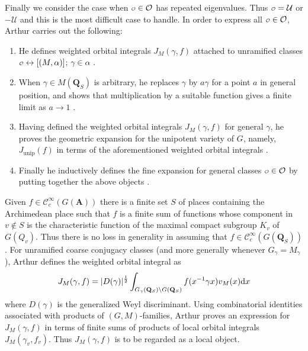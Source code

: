 \documentclass[11pt]{amsart}
\def\A{\mathbf A}
\def\Q{\mathbf Q}
\def\CCC{\mathcal C}
\def\O{\mathcal O}
\def\o{\scalebox{0.8}{$\scriptstyle\mathcal{O}$}}
\def\UUU{\mathcal U}
\def\d{\text d}
\def\bs{\setminus}
\def\mod#1{\lvert #1 \rvert} %
\theoremstyle{remark}
\begin{document}
Finally we consider the case when $\o \in \O$ has repeated eigenvalues. Thus $\o = \UUU$ or $-\UUU$ and this is the most difficult case to handle. In order to express all $\o \in \O$, Arthur carries out the following:
\begin{enumerate}
	\item He defines weighted orbital integrals $J_M(\gamma, f)$ attached to unramified classes $\o \leftrightarrow [(M, \alpha)]$; $\gamma \in \alpha$ \cite{MR625344}. 
	\item When $\gamma \in M(\Q_S)$ is arbitrary, he replaces $\gamma$ by $a \gamma$ for a point $a$ in general position, and shows that multiplication by a suitable function gives a finite limit as $a \to 1$ \cite{MR932848}.
	\item Having defined the weighted orbital integrals $J_M(\gamma, f)$ for general $\gamma$, he proves the geometric expansion for the unipotent variety of $G$, namely, $J_{\text{unip}}(f)$ in terms of the aforementioned weighted orbital integrals \cite{MR828844}. 
	\item Finally he inductively defines the fine expansion for general classes $\o \in \O$ by putting together the above objects \cite{MR835041}.
\end{enumerate}
Given $f \in \CCC_c^\infty(G(\A))$ there is a finite set $S$ of places containing the Archimedean place such that $f$ is a finite sum of functions whose component in $v \not \in S$ is the characteristic function of the maximal compact subgroup $K_v$ of $G(Q_v)$. Thus there is no loss in generality in assuming that $f \in \CCC_c^\infty(G(\Q_S))$. For unramified coarse conjugacy classes (and more generally whenever $G_\gamma = M_\gamma$), Arthur defines the weighted orbital integral as 
\begin{equation} \label{jm}
	J_M(\gamma, f) = \mod{D(\gamma)}^{\frac{1}{2}} \int_{G_\gamma(\Q_S)\bs G(\Q_S)} f(x^{-1}\gamma x) v_M(x) \d x
\end{equation}
where $D(\gamma)$ is the generalized Weyl discriminant. Using combinatorial identities associated with products of $(G, M)$-families, Arthur proves an expression for $J_M(\gamma, f)$ in terms of finite sums of products of local orbital integrals $J_M(\gamma_v, f_v)$. Thus $J_M(\gamma, f)$ is to be regarded as a local object. 
\end{document}
